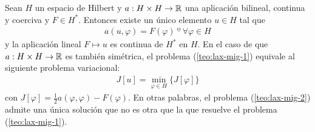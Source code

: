 \documentclass[12pt]{book}
\begin{document}
    \begin{teo}
        Sean $H$ un espacio de Hilbert y $a: H \times H \to \mathbb{R}$ una aplicación bilineal, continua y coerciva y $F\in H^*$. Entonces existe un único elemento $u\in H$ tal que 
        \begin{gather}\label{teo:lax-mig-1}
            a(u, \varphi) = F(\varphi) \ º \ \forall \varphi \in H
        \end{gather}
        y la aplicación lineal $F\mapsto u$ es continua de $H^*$ en $H$. En el caso de que $a : H\times H \to \mathbb{R}$ es también simétrica, el problema (\ref{teo:lax-mig-1}) equivale al siguiente problema variacional:
        \begin{gather} \label{teo:lax-mig-2}
            J[u] = \min_{\varphi\in H}\{J[\varphi]\}
        \end{gather}
        con $J[\varphi] = \frac{1}{2}a(\varphi, \varphi) - F(\varphi)$. En otras palabras, el problema (\ref{teo:lax-mig-2}) admite una única solución que no es otra que la que resuelve el problema (\ref{teo:lax-mig-1}).
    \end{teo}
\end{document}
